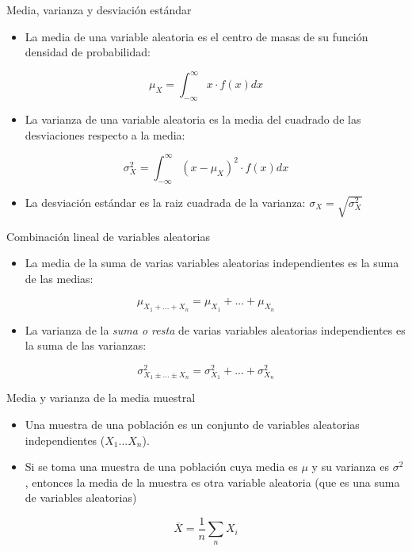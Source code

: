 \documentclass[xcolor={usenames,svgnames,dvipsnames}]{beamer}
\begin{document}
\begin{frame}[label=sec-7-1-5]{Media, varianza y desviación estándar}
\begin{itemize}
\item La \alert{media} de una variable aleatoria es el \alert{centro de masas} de su función densidad de probabilidad:
\end{itemize}

\[
\mu_{X}=\int_{-\infty}^{\infty}x\cdot f(x)dx
\]

\begin{itemize}
\item La \alert{varianza} de una variable aleatoria es la \alert{media del cuadrado de las desviaciones} respecto a la media:
\end{itemize}

\[
\sigma_{X}^{2}=\int_{-\infty}^{\infty}(x-\mu_{X})^{2}\cdot f(x)dx
\]

\begin{itemize}
\item La \alert{desviación estándar} es la raiz cuadrada de la varianza: $\sigma_{X}=\sqrt{\sigma_{X}^2}$
\end{itemize}
\end{frame}



\begin{frame}[label=sec-7-1-6]{Combinación lineal de variables aleatorias}
\begin{itemize}
\item La \alert{media de la suma} de varias variables aleatorias \alert{independientes} es
la suma de las medias:
\end{itemize}
\[
\mu_{X_{1}+...+X_{n}}=\mu_{X_{1}}+...+\mu_{X_{n}}
\]

\begin{itemize}
\item La \alert{varianza de la \emph{suma o resta}} de varias variables aleatorias
\alert{independientes} es la \alert{suma} de las varianzas:
\end{itemize}

\[
\sigma_{X_{1}\pm...\pm X_{n}}^{2}=\sigma_{X_{1}}^{2}+...+\sigma_{X_{n}}^{2}
\]
\end{frame}



\begin{frame}[label=sec-7-1-7]{Media y varianza de la media muestral}
\begin{itemize}
\item Una \alert{muestra de una población} es un conjunto de variables
aleatorias independientes ($X_{1}...X_{n}$).

\item Si se toma una muestra de una población cuya media es $\mu$ y su
varianza es $\sigma^{2}$, entonces la media de la muestra es otra
variable aleatoria (que es una suma de variables aleatorias)
\end{itemize}

\[
\overline{X}=\frac{1}{n}\sum_{n}X_{i}
\]
\end{frame}
\end{document}

